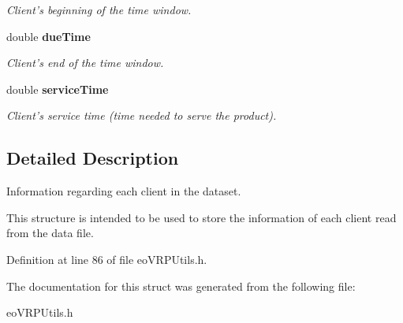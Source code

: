 \begin{CompactItemize}
\begin{CompactList}\small\item\em Client's beginning of the time window. \item\end{CompactList}\item 
double \bf{due\-Time}\label{structeo_v_r_p_utils_1_1_client_data_2e8c450e35be04f80c4949f6efaac618}

\begin{CompactList}\small\item\em Client's end of the time window. \item\end{CompactList}\item 
double \bf{service\-Time}\label{structeo_v_r_p_utils_1_1_client_data_515b7488b4c4f6e1806b7a9606ab1cc3}

\begin{CompactList}\small\item\em Client's service time (time needed to serve the product). \item\end{CompactList}\end{CompactItemize}


\subsection{Detailed Description}
Information regarding each client in the dataset. 

This structure is intended to be used to store the information of each client read from the data file. 



Definition at line 86 of file eo\-VRPUtils.h.

The documentation for this struct was generated from the following file:\begin{CompactItemize}
\item 
eo\-VRPUtils.h\end{CompactItemize}
